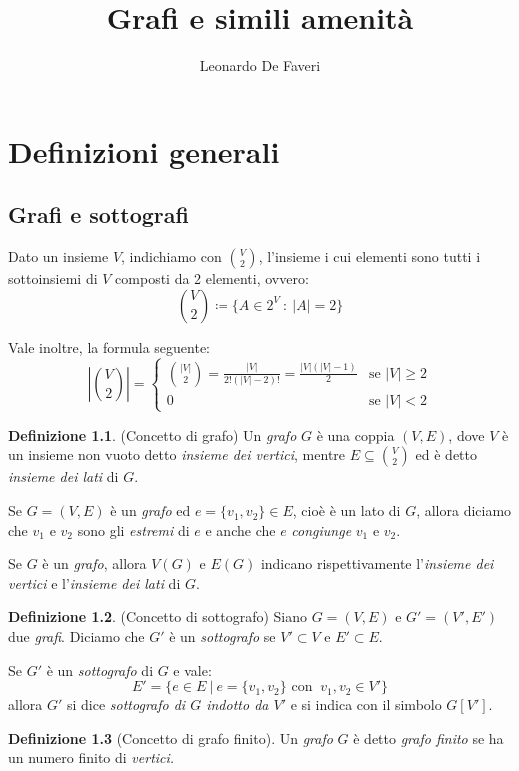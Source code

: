 \documentclass[12pt, a4paper]{report}
\title{Grafi e simili amenità}
\author{Leonardo De Faveri}
\date{}
\theoremstyle{definition}
\newtheorem{definition}{Definizione}[section]
\begin{document}
\maketitle
\tableofcontents

\chapter{Definizioni generali}
\section{Grafi e sottografi}
Dato un insieme $V$, indichiamo con $\binom{V}{2}$, l'insieme i cui elementi sono
tutti i sottoinsiemi di $V$ composti da 2 elementi, ovvero:
\[\binom{V}{2}\coloneqq\{A\in 2^V\ :\ |A|=2\}\]

Vale inoltre, la formula seguente:
\[\left|\binom{V}{2}\right|=\begin{cases}
    \binom{|V|}{2}=\frac{|V|}{2!(|V|-2)!}=\frac{|V|(|V|-1)}{2}
    & \text{se } |V|\geq 2\\
    0 & \text{se } |V|<2
\end{cases}\]

\begin{definition}(Concetto di grafo)
    Un \emph{grafo} $G$ è una coppia $(V,E)$, dove $V$ è un insieme non vuoto
    detto \emph{insieme dei vertici}, mentre $E\subseteq\binom{V}{2}$ ed è detto
    \emph{insieme dei lati} di $G$.

    Se $G=(V,E)$ è un \emph{grafo} ed $e=\{v_1, v_2\}\in E$, cioè è un lato di $G$,
    allora diciamo che $v_1$ e $v_2$ sono gli \emph{estremi} di $e$ e anche che
    $e$ \emph{congiunge} $v_1$ e $v_2$.

    Se $G$ è un \emph{grafo}, allora $V(G)$ e $E(G)$ indicano rispettivamente
    l'\emph{insieme dei vertici} e l'\emph{insieme dei lati} di $G$.
\end{definition}

\begin{definition}(Concetto di sottografo)
    Siano $G=(V,E)$ e $G'=(V',E')$ due \emph{grafi}. Diciamo che $G'$ è un
    \emph{sottografo} se $V'\subset V$ e $E'\subset E$.
    
    Se $G'$ è un \emph{sottografo} di $G$ e vale:
    \[E'=\{e\in E\ |\ e=\{v_1, v_2\}\text{ con }\ v_1,v_2\in V'\}\]
    allora $G'$ si dice \emph{sottografo di $G$ indotto da $V'$} e si indica con
    il simbolo $G[V']$.
\end{definition}

\begin{definition}[Concetto di grafo finito]
    Un \emph{grafo} $G$ è detto \emph{grafo finito} se ha un numero finito di
    \emph{vertici.}
\end{definition}
\end{document}
